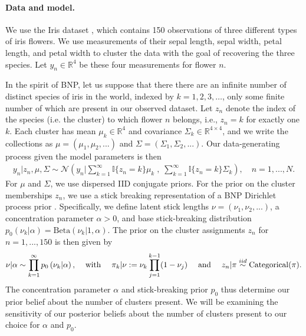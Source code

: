 \paragraph{Data and model.}
We use the Iris dataset \citep{iris_data_anderson, iris_data_fisher}, which
contains 150 observations of three different types of iris flowers. We use
measurements of their sepal length, sepal width, petal length, and petal width
to cluster the data with the goal of recovering the three species. Let $y_{n}\in
\mathbb{R}^4$ be these four measurements for flower $n$.

In the spirit of BNP, let us suppose that there there are an infinite number of
distinct species of iris in the world, indexed by $k=1,2,3,\ldots$, only some
finite number of which are present in our observed dataset.  Let $z_n$ denote
the index of the species (i.e. the cluster) to which flower $n$ belongs, i.e.,
$z_n = k$ for exactly one $k$. Each cluster has mean $\mu_k\in
\mathbb{R}^4$ and covariance $\Sigma_k \in \mathbb{R}^{4\times 4}$, and we write
the collections as $\mu = \left(\mu_1, \mu_2, ...\right)$ and $\Sigma =
\left(\Sigma_1, \Sigma_2, ... \right)$. Our data-generating process given the
model parameters is then
%
\begin{align*}
	y_n | z_n, \mu, \Sigma \sim
        \mathcal{N}\left(
            y_n \Big\vert
                \sum_{k=1}^\infty \mathbb{I}\{z_n = k\} \mu_k \;,
              \; \sum_{k=1}^\infty \mathbb{I}\{z_n = k\} \Sigma_k\right),
	\quad n = 1, ..., N.
\end{align*}
%
For $\mu$ and $\Sigma$, we use dispersed IID conjugate priors. For the prior on
the cluster memberships $z_n$, we use a stick breaking representation of a BNP
Dirichlet process prior \citep{mccloskey:1965:model, ferguson:1973:bayesian,
patil:1977:diversity, sethuraman:1994:constructivedp}. Specifically, we define
latent stick lengths $\nu=\left(\nu_1, \nu_2, ...\right)$, a concentration
parameter $\alpha>0$, and base stick-breaking distribution $p_{0}\left(\nu_k
\vert \alpha \right) = \mathrm{Beta}\left(\nu_k \Big\vert 1, \alpha \right)$.
The prior on the cluster assignments $z_n$ for $n=1,...,150$ is then given by
%
\begin{align}
\nu \vert \alpha \sim \prod_{k=1}^\infty p_{0}\left(\nu_k \vert \alpha \right)
\textrm{,}
    \quad\textrm{ with }\quad
\pi_k | \nu := \nu_k \prod_{j=1}^{k-1} (1 - \nu_j)
\quad\textrm{ and }\quad
z_n \vert \pi \stackrel{iid}{\sim} \mathrm{Categorical}(\pi). \label{eq:stick_breaking}
\end{align}
%
The concentration parameter $\alpha$ and stick-breaking prior $p_{0}$
thus determine our prior belief about the number of clusters present.
We will be examining the sensitivity of our posterior beliefs about the
number of clusters present to our choice for $\alpha$ and $p_{0}$.
